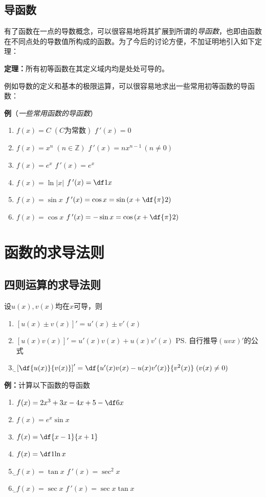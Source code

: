 \subsection{导函数}

有了函数在一点的导数概念，可以很容易地将其扩展到所谓的{\it 导函数}，也即由函数
在不同点处的导数值所构成的函数。为了今后的讨论方便，不加证明地引入如下定理：

{\bf 定理：}所有初等函数在其定义域内均是处处可导的。


例如导数的定义和基本的极限运算，可以很容易地求出一些常用初等函数的导函数：

{\bf 例}（{\it 一些常用函数的导函数}）
\begin{enumerate}[(1)]
  \setlength{\itemindent}{1cm}
  \item $f(x)=C\;(C\mbox{为常数})$ \hfill $f\,'(x)=0$ 
  \item $f(x)=x^n\;(n\in\mathbb{Z})$ \hfill $f\,'(x)=nx^{n-1}\,(n\ne
  0)$ 
  \item $f(x)=e^x$ \hfill $f\,'(x)=e^x$ 
  \item $f(x)=\ln|x|$ \hfill $f\,'(x)=\df 1x$ 
  \item $f(x)=\sin x$ \hfill $f\,'(x)=\cos x=\sin\left(x+\df{\pi}2\right)$ 
  \item $f(x)=\cos x$ \hfill $f\,'(x)=-\sin x=\cos\left(x+\df{\pi}2\right)$
\end{enumerate}

\section{函数的求导法则}

\subsection{四则运算的求导法则}

设$u(x),v(x)$均在$x$可导，则
\begin{enumerate}[(1)]
  \setlength{\itemindent}{1cm}
  \item $[u(x)\pm v(x)]'=u'(x)\pm v'(x)$ 
  \item $[u(x)v(x)]' =u'(x)v(x)+u(x)v'(x)$ \ps{自行推导$(uvx)'$的公式}
  \item {\b$\left[\df{u(x)}{v(x)}\right]'
  =\df{u'(x)v(x)-u(x)v'(x)}{v^2(x)}\;(v(x)\ne 0)$}
\end{enumerate}

{\bf 例：}计算以下函数的导函数
\begin{enumerate}[(1)]
  \setlength{\itemindent}{1cm}
  \item $f(x)=2x^3+3x-4x+5-\df 6x$ 
  \item $f(x)=e^x\sin x$ 
  \item $f(x)=\df{x-1}{x+1}$ 
  \item $f(x)=\df 1{\ln x}$ 
  \item {\b$f(x)=\tan x$ \hfill $f\,'(x)=\sec^2 x$ }
  \item {\b$f(x)=\sec x$ \hfill $f\,'(x)=\sec x\tan x$}
\end{enumerate}

